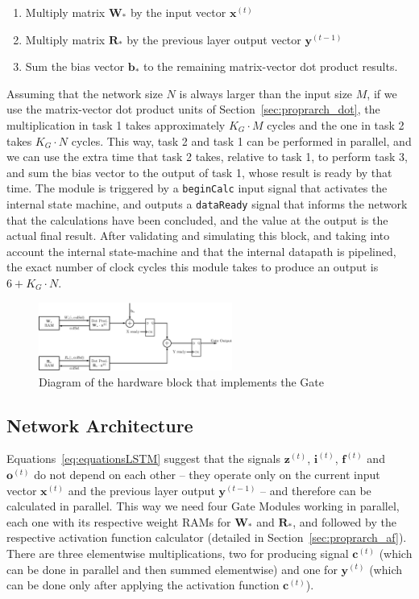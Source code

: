 \documentclass{IEEEtran}
\newcommand{\mb}[1]{\mathbf{#1}}
\begin{document}
\begin{enumerate}
    \item Multiply matrix $\mb{W}_*$ by the input vector $\mb{x}^{(t)}$
    \item Multiply matrix $\mb{R}_*$ by the previous layer output vector $\mb{y}^{(t-1)}$
    \item Sum the bias vector $\mb{b}_*$ to the remaining matrix-vector dot product results.
\end{enumerate}
Assuming that the network size $N$ is always larger than the input size $M$, if we use the matrix-vector dot product units of Section~\ref{sec:proprarch_dot}, the multiplication
in task 1 takes approximately $K_G\cdot M$ cycles and the one in task 2 takes $K_G\cdot N$ cycles. This way, task 2 and task 1 can be performed in parallel, and we can use the extra time that task 2 takes, relative to task 1,  to perform task 3, and sum the bias vector to the output of task 1, whose result is ready by that time. The module is triggered by a \verb+beginCalc+ input signal that activates the internal state machine, and outputs a \verb+dataReady+ signal that informs the network that the calculations have been concluded, and the value at the output is the actual final result.
After validating and simulating this block, and taking into account the internal state-machine and that the internal datapath is pipelined, the exact number
of clock cycles this module takes to produce an output is $6+K_G\cdot N$.

\begin{figure}
    \centering
    \includegraphics[width=2.5in]{figures/gate.eps}
    \caption[Diagram of the hardware block that implements the Gate]{Diagram of the hardware block that implements the Gate}
    \label{fig:gate}
\end{figure}

\subsection{Network Architecture}\label{sec:proprarch_net}
Equations~\ref{eq:equationsLSTM} suggest that the signals $\mb{z}^{(t)}$, $\mb{i}^{(t)}$, $\mb{f}^{(t)}$ and $\mb{o}^{(t)}$ do not depend on each other -- they
operate only on the current input vector $\mb{x}^{(t)}$ and the previous layer output $\mb{y}^{(t-1)}$ -- and therefore can be calculated in parallel. This way we
need four Gate Modules working in parallel, each one with its respective weight RAMs for $\mb{W}_*$ and $\mb{R}_*$, and followed by the respective activation
function calculator (detailed in Section~\ref{sec:proprarch_af}). There are three elementwise multiplications, two for producing signal $\mb{c}^{(t)}$ (which
can be done in parallel and then summed elementwise) and one for $\mb{y}^{(t)}$ (which can be done only after applying the activation function $\mb{c}^{(t)}$).
\end{document}

